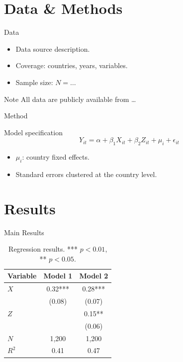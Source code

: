 \documentclass[aspectratio=169]{beamer}
\begin{document}
\section{Data \& Methods}

\begin{frame}{Data}
  \begin{itemize}
    \item Data source description.
    \item Coverage: countries, years, variables.
    \item Sample size: $N = \ldots$
  \end{itemize}

  \begin{alertblock}{Note}
    All data are publicly available from \ldots
  \end{alertblock}
\end{frame}

\begin{frame}{Method}
  \begin{block}{Model specification}
    \[
      Y_{it} = \alpha + \beta_1 X_{it} + \beta_2 Z_{it} + \mu_i + \epsilon_{it}
    \]
  \end{block}
  \vspace{0.5em}
  \begin{itemize}
    \item $\mu_i$: country fixed effects.
    \item Standard errors clustered at the country level.
  \end{itemize}
\end{frame}

\section{Results}

\begin{frame}{Main Results}
  \begin{table}
    \centering
    \begin{tabular}{lcc}
      \hline\hline
      Variable & Model 1 & Model 2 \\
      \hline
      $X$       & 0.32*** & 0.28*** \\
                & (0.08)  & (0.07)  \\
      $Z$       &         & 0.15**  \\
                &         & (0.06)  \\
      \hline
      $N$       & 1{,}200 & 1{,}200 \\
      $R^2$     & 0.41    & 0.47    \\
      \hline\hline
    \end{tabular}
    \caption{Regression results. *** $p<0.01$, ** $p<0.05$.}
  \end{table}
\end{frame}
\end{document}
